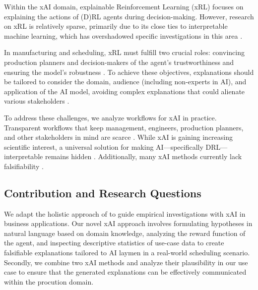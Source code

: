 Within the xAI domain, explainable Reinforcement Learning (xRL)  focuses on explaining the actions of (D)RL agents during decision-making. However, research on xRL is relatively sparse, primarily due to its close ties to interpretable machine learning, which has overshadowed specific investigations in this area .

In manufacturing and scheduling, xRL must fulfill two crucial roles: convincing production planners and decision-makers of the agent's trustworthiness and ensuring the model's robustness . To achieve these objectives, explanations should be tailored to consider the domain, audience (including non-experts in AI), and application of the AI model, avoiding complex explanations that could alienate various stakeholders .

To address these challenges, we analyze workflows for xAI in practice. Transparent workflows that keep management, engineers, production planners, and other stakeholders in mind are scarce . While xAI is gaining increasing scientific interest, a universal solution for making AI—specifically DRL—interpretable remains hidden . Additionally, many xAI methods currently lack falsifiability \cite{leavitt2020towards}.

\subsection{Contribution and Research Questions}
We adapt the holistic approach of  to guide empirical investigations with xAI in business applications. Our novel xAI approach involves formulating hypotheses in natural language based on domain knowledge, analyzing the reward function of the agent, and inspecting descriptive statistics of use-case data to create falsifiable explanations tailored to AI laymen in a real-world scheduling scenario.
Secondly, we combine two xAI methods and analyze their plausibility in our use case to ensure that the generated explanations can be effectively communicated within the procution domain.

